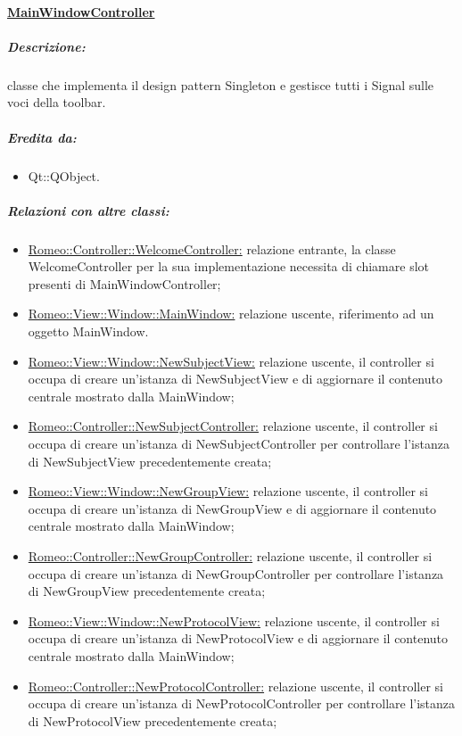 	\paragraph{\underline{MainWindowController}}
	\label{controller_main}
		\subparagraph{Descrizione:} classe che implementa il design pattern\g{} Singleton e gestisce tutti i Signal\g{} sulle voci della toolbar.
		\subparagraph{Eredita da:}
			\begin{itemize}
				\item Qt::QObject.
			\end{itemize}
		\subparagraph{Relazioni con altre classi:}
			\begin{itemize}
				\item \hyperref[controller_wp]{Romeo::Controller::WelcomeController:} relazione entrante, la classe WelcomeController per la sua implementazione necessita di chiamare slot presenti di MainWindowController;
				\item \hyperref[mainview]{Romeo::View::Window::MainWindow:} relazione uscente, riferimento ad un oggetto MainWindow.
				\item \hyperref[nsv]{Romeo::View::Window::NewSubjectView:} relazione uscente, il controller si occupa di creare un'istanza di NewSubjectView e di aggiornare il contenuto centrale mostrato dalla MainWindow;
				\item \hyperref[controller_ns]{Romeo::Controller::NewSubjectController:} relazione uscente, il controller si occupa di creare un'istanza di NewSubjectController per controllare l'istanza di NewSubjectView precedentemente creata;
				\item \hyperref[ngv]{Romeo::View::Window::NewGroupView:} relazione uscente, il controller si occupa di creare un'istanza di NewGroupView e di aggiornare il contenuto centrale mostrato dalla MainWindow;
				\item \hyperref[controller_ngs]{Romeo::Controller::NewGroupController:} relazione uscente, il controller si occupa di creare un'istanza di NewGroupController per controllare l'istanza di NewGroupView precedentemente creata;
				\item \hyperref[npv]{Romeo::View::Window::NewProtocolView:} relazione uscente, il controller si occupa di creare un'istanza di NewProtocolView e di aggiornare il contenuto centrale mostrato dalla MainWindow;
				\item \hyperref[controller_np]{Romeo::Controller::NewProtocolController:} relazione uscente, il controller si occupa di creare un'istanza di NewProtocolController per controllare l'istanza di NewProtocolView precedentemente creata;

\end{itemize}
